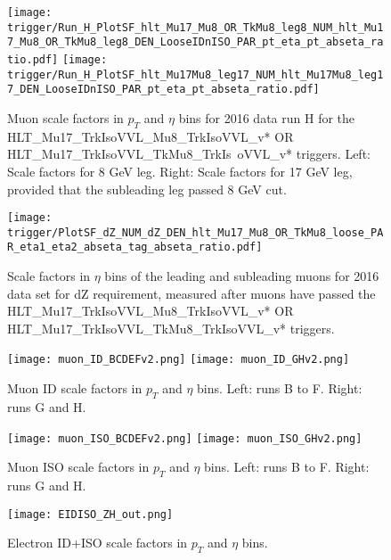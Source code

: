 \begin{figure}
\centering
\texttt{[image: trigger/Run\_H\_PlotSF\_hlt\_Mu17\_Mu8\_OR\_TkMu8\_leg8\_NUM\_hlt\_Mu17\_Mu8\_OR\_TkMu8\_leg8\_DEN\_LooseIDnISO\_PAR\_pt\_eta\_pt\_abseta\_ratio.pdf]}
\texttt{[image: trigger/Run\_H\_PlotSF\_hlt\_Mu17Mu8\_leg17\_NUM\_hlt\_Mu17Mu8\_leg17\_DEN\_LooseIDnISO\_PAR\_pt\_eta\_pt\_abseta\_ratio.pdf]}\\
\caption{Muon scale factors in $p_{T}$ and $\eta$ bins for 2016 data run H for the  HLT\_Mu17\_TrkIsoVVL\_Mu8\_TrkIsoVVL\_v* OR HLT\_Mu17\_TrkIsoVVL\_TkMu8\_TrkIs\
oVVL\_v* triggers. Left: Scale factors for 8 GeV leg. Right: Scale factors for 17 GeV leg, provided that the subleading leg passed 8 GeV cut.}

\label{fig:trigger_SF_dimu_H}
\end{figure}

\begin{figure}
\centering
\texttt{[image: trigger/PlotSF\_dZ\_NUM\_dZ\_DEN\_hlt\_Mu17\_Mu8\_OR\_TkMu8\_loose\_PAR\_eta1\_eta2\_abseta\_tag\_abseta\_ratio.pdf]}
\caption{Scale factors in $\eta$ bins of the leading and subleading muons for 2016 data set for dZ requirement, measured after muons have passed the HLT\_Mu17\_TrkIsoVVL\_Mu8\_TrkIsoVVL\_v* OR HLT\_Mu17\_TrkIsoVVL\_TkMu8\_TrkIsoVVL\_v* triggers. }
\label{fig:trigger_SF_dimu_dZ_H}
\end{figure}




\begin{figure}
\centering
\texttt{[image: muon\_ID\_BCDEFv2.png]}
\bigbreak
\texttt{[image: muon\_ID\_GHv2.png]}
\caption{ Muon ID scale factors in $p_{T}$ and $\eta$ bins. Left: runs B to F. Right: runs G and H.}
\label{fig:muonID_SF}
\end{figure}


\begin{figure}
\centering
\texttt{[image: muon\_ISO\_BCDEFv2.png]}
\bigbreak
\texttt{[image: muon\_ISO\_GHv2.png]}
\caption{ Muon ISO scale factors in $p_{T}$ and $\eta$ bins. Left: runs B to F. Right: runs G and H.}
\label{fig:muonISO_SF}
\end{figure}

\begin{figure}
\centering
\texttt{[image: EIDISO\_ZH\_out.png]}
\caption{ Electron ID+ISO scale factors in $p_{T}$ and $\eta$ bins.}
\label{fig:eleIDnISO_SF}
\end{figure}



